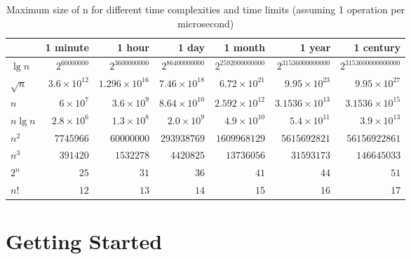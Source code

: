 \documentclass{book}
\begin{document}
\begin{table}[h]
    \centering
    \begin{tabular}{|l|r|r|r|r|r|r|}
        \hline
        & 1 minute & 1 hour & 1 day & 1 month & 1 year & 1 century \\
        \hline
        $\lg n$     & $2^{60000000}$ & $2^{3600000000}$ & $2^{86400000000}$ & $2^{2592000000000}$ & $2^{31536000000000}$ & $2^{3153600000000000}$ \\
        $\sqrt{n}$  & $3.6 \times 10^{12}$ & $1.296 \times 10^{16}$ & $7.46 \times 10^{18}$ & $6.72 \times 10^{21}$ & $9.95 \times 10^{23}$ & $9.95 \times 10^{27}$ \\
        $n$         & $6 \times 10^7$ & $3.6 \times 10^9$ & $8.64 \times 10^{10}$ & $2.592 \times 10^{12}$ & $3.1536 \times 10^{13}$ & $3.1536 \times 10^{15}$ \\
        $n \lg n$   & $2.8 \times 10^6$ & $1.3 \times 10^8$ & $2.0 \times 10^9$ & $4.9 \times 10^{10}$ & $5.4 \times 10^{11}$ & $3.9 \times 10^{13}$ \\
        $n^2$       & $7745966$ & $60000000$ & $293938769$ & $1609968129$ & $5615692821$ & $56156922861$ \\
        $n^3$       & $391420$ & $1532278$ & $4420825$ & $13736056$ & $31593173$ & $146645033$ \\
        $2^n$       & $25$ & $31$ & $36$ & $41$ & $44$ & $51$ \\
        $n!$        & $12$ & $13$ & $14$ & $15$ & $16$ & $17$ \\
        \hline
    \end{tabular}
    \caption{Maximum size of n for different time complexities and time limits (assuming 1 operation per microsecond)}
    \label{tab:time_complexity}
\end{table}


\chapter{Getting Started}
\end{document}
